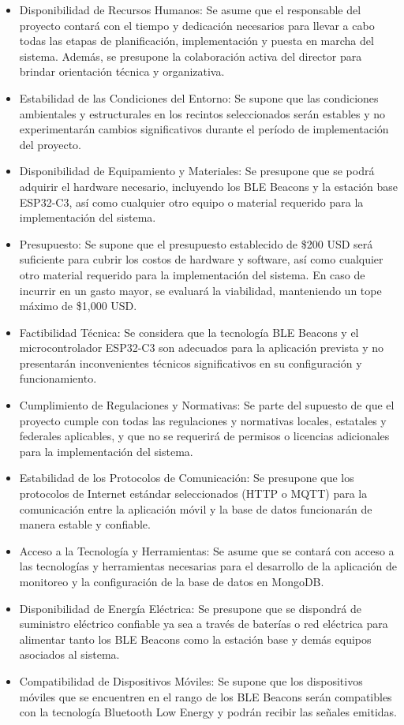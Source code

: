 \documentclass[
11pt, %
]{charter}
\begin{document}
\begin{itemize}
	\item Disponibilidad de Recursos Humanos: Se asume que el responsable del proyecto contará con el tiempo y dedicación necesarios para llevar a cabo todas las etapas de planificación, implementación y puesta en marcha del sistema. Además, se presupone la colaboración activa del director para brindar orientación técnica y organizativa.
	\item Estabilidad de las Condiciones del Entorno: Se supone que las condiciones ambientales y estructurales en los recintos seleccionados serán estables y no experimentarán cambios significativos durante el período de implementación del proyecto.
	\item Disponibilidad de Equipamiento y Materiales: Se presupone que se podrá adquirir el hardware necesario, incluyendo los BLE Beacons y la estación base ESP32-C3, así como cualquier otro equipo o material requerido para la implementación del sistema.
	\item Presupuesto: Se supone que el presupuesto establecido de {\$200} USD será suficiente para cubrir los costos de hardware y software, así como cualquier otro material requerido para la implementación del sistema. En caso de incurrir en un gasto mayor, se evaluará la viabilidad, manteniendo un tope máximo de {\$1,000} USD.
	\item Factibilidad Técnica: Se considera que la tecnología BLE Beacons y el microcontrolador ESP32-C3 son adecuados para la aplicación prevista y no presentarán inconvenientes técnicos significativos en su configuración y funcionamiento.
	\item Cumplimiento de Regulaciones y Normativas: Se parte del supuesto de que el proyecto cumple con todas las regulaciones y normativas locales, estatales y federales aplicables, y que no se requerirá de permisos o licencias adicionales para la implementación del sistema.
	\item Estabilidad de los Protocolos de Comunicación: Se presupone que los protocolos de Internet estándar seleccionados (HTTP o MQTT) para la comunicación entre la aplicación móvil y la base de datos funcionarán de manera estable y confiable.
	\item Acceso a la Tecnología y Herramientas: Se asume que se contará con acceso a las tecnologías y herramientas necesarias para el desarrollo de la aplicación de monitoreo y la configuración de la base de datos en MongoDB.
	\item Disponibilidad de Energía Eléctrica: Se presupone que se dispondrá de suministro eléctrico confiable ya sea a través de baterías o red eléctrica para alimentar tanto los BLE Beacons como la estación base y demás equipos asociados al sistema.
	\item Compatibilidad de Dispositivos Móviles: Se supone que los dispositivos móviles que se encuentren en el rango de los BLE Beacons serán compatibles con la tecnología Bluetooth Low Energy y podrán recibir las señales emitidas. 
\end{itemize}
\end{document}
